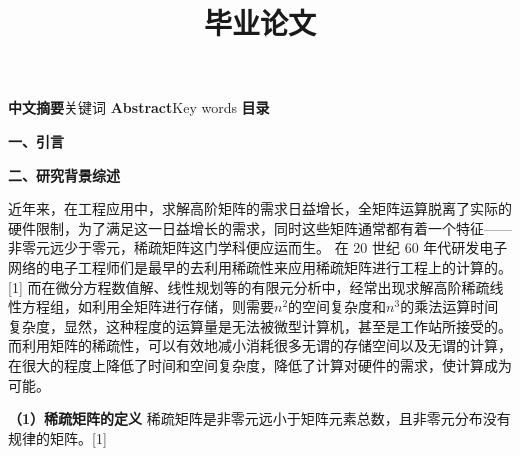\documentclass{article}
\begin{document}
  

\title{毕业论文}
\date{}

\maketitle


\textbf{中文摘要}关键词
      \qquad
\newline
\textbf{Abstract}Key words
      \qquad
\newline
\textbf{目录}
      \qquad
\newline

\textbf{一、引言}
      \qquad
\newline

\textbf{二、研究背景综述}
      \qquad
\newline

近年来，在工程应用中，求解高阶矩阵的需求日益增长，全矩阵运算脱离了实际的硬件限制，为了满足这一日益增长的需求，同时这些矩阵通常都有着一个特征——非零元远少于零元，稀疏矩阵这门学科便应运而生。
在 20 世纪 60 年代研发电子网络的电子工程师们是最早的去利用稀疏性来应用稀疏矩阵进行工程上的计算的。[1]
而在微分方程数值解、线性规划等的有限元分析中，经常出现求解高阶稀疏线性方程组，如利用全矩阵进行存储，则需要$n^2$的空间复杂度和$n^3$的乘法运算时间复杂度，显然，这种程度的运算量是无法被微型计算机，甚至是工作站所接受的。
而利用矩阵的稀疏性，可以有效地减小消耗很多无谓的存储空间以及无谓的计算，在很大的程度上降低了时间和空间复杂度，降低了计算对硬件的需求，使计算成为可能。
\newline

\textbf{（1）稀疏矩阵的定义}
      \qquad
\newline
稀疏矩阵是非零元远小于矩阵元素总数，且非零元分布没有规律的矩阵。[1]
\end{document}
